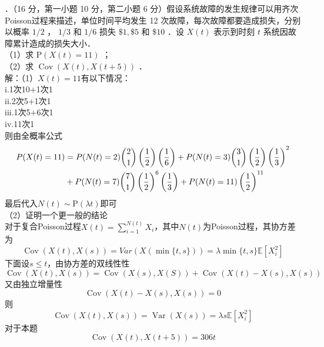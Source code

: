 \documentclass[UTF8,openany]{book}
\begin{document}
．（16 分，第一小题 10 分，第二小题 6 分）假设系统故障的发生规律可以用齐次 Poisson过程来描述，单位时间平均发生 12 次故障，每次故障都要造成损失，分别以概率 $1 / 2$ ， $1 / 3$ 和 $1 / 6$ 损失 $\$ 1, \$ 5$ 和 $\$ 10$ ．设 $X(t)$ 表示到时刻 $t$ 系统因故障累计造成的损失大小．\\
（1）求 $\mathrm{P}(X(t)=11)$ ；\\
（2）求 $\operatorname{Cov}(X(t), X(t+5))$ ．\\
解：（1）$X(t)=11$有以下情况：\\
i.1次10$+$1次1\\
ii.2次5$+$1次1\\
iii.1次5$+$6次1\\
iv.11次1\\
则由全概率公式
\begin{align*}
	P(X(t)=11) & =P(N(t)=2)\dbinom{2}{1}\left(\frac{1}{2} \right)\left(\frac{1}{6} \right)+  P(N(t)=3)\dbinom{3}{1}\left(\frac{1}{2} \right)\left(\frac{1}{3} \right)^2 \\
	& +  P(N(t)=7)\dbinom{7}{1}\left(\frac{1}{2} \right)^6 \left(\frac{1}{3} \right)+  P(N(t)=11)\left(\frac{1}{2} \right)^{11}
\end{align*}
最后代入$N(t)\sim \mathrm{P}(\lambda t )$即可\\
（2）证明一个更一般的结论\\
对于复合Poisson过程$X(t)=\sum\limits_{i=1}^{N(t)} X_i$，其中$N(t)$为Poisson过程，其协方差为
\[
\operatorname{Cov}\left(X(t),X(s) \right)=Var(X(\min\{t,s\})) =\lambda \min\{t,s\}\mathbb{E}[X_i^2]
\]
下面设$s\le t$，由协方差的双线性性
\[
\operatorname{Cov}\left(X(t),X(s) \right)=\operatorname{Cov}(X(s),X(S))+\operatorname{Cov}(X(t)-X(s),X(s))
\]
又由独立增量性
\[
\operatorname{Cov}(X(t)-X(s),X(s))=0
\]
则
\[
\operatorname{Cov}\left(X(t),X(s) \right)=\operatorname{Var}(X(s)) =\lambda s\mathbb{E}[X_i^2]
\]
对于本题
\[
\operatorname{Cov}(X(t), X(t+5))=306t
\]\\
\end{document}
